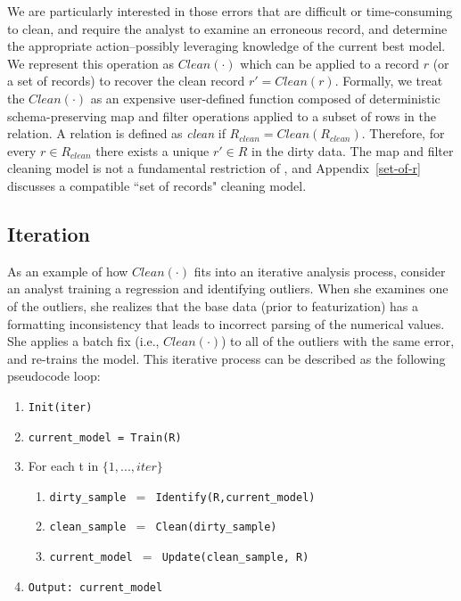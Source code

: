 We are particularly interested in those errors that are difficult or time-consuming to clean, and require the analyst to examine an erroneous record, and determine the appropriate action--possibly leveraging knowledge of the current best model.
We represent this operation as $Clean(\cdot)$ which can be applied to a record $r$ (or a set of records) to recover the clean record $r' = Clean(r)$.
Formally, we treat the $Clean(\cdot)$ as an expensive user-defined function composed of deterministic schema-preserving \textsf{map} and \textsf{filter} operations applied to a subset of rows in the relation.
A relation is defined as \emph{clean} if $R_{clean} = Clean(R_{clean})$.
Therefore, for every $r \in R_{clean}$ there exists a unique $r' \in R$ in the dirty data.
The \textsf{map} and \textsf{filter} cleaning model is not a fundamental restriction of \sys, and Appendix~\ref{set-of-r} discusses a compatible ``set of records" cleaning model.

\subsection{Iteration}
As an example of how $Clean(\cdot)$ fits into an iterative analysis process, consider an analyst training a regression and identifying outliers. 
When she examines one of the outliers, she realizes that the base data (prior to featurization) has a formatting inconsistency that leads to incorrect parsing of the numerical values.
She applies a batch fix (i.e., $Clean(\cdot)$) to all of the outliers with the same error, and re-trains the model. 
This iterative process can be described as the following pseudocode loop:
\begin{enumerate}[leftmargin=1em]\scriptsize\sloppy
  \item \texttt{Init(iter)}
  \item \texttt{current\_model = Train(R)}
  \item For each t in $\{1,...,iter\}$
  \begin{enumerate}
    \item \texttt{dirty\_sample $=$ Identify(R,current\_model)}
    \item \texttt{clean\_sample $=$ Clean(dirty\_sample)}
    \item \texttt{current\_model $=$ Update(clean\_sample, R)}
  \end{enumerate}
  \item \texttt{Output: current\_model}
  \end{enumerate}

